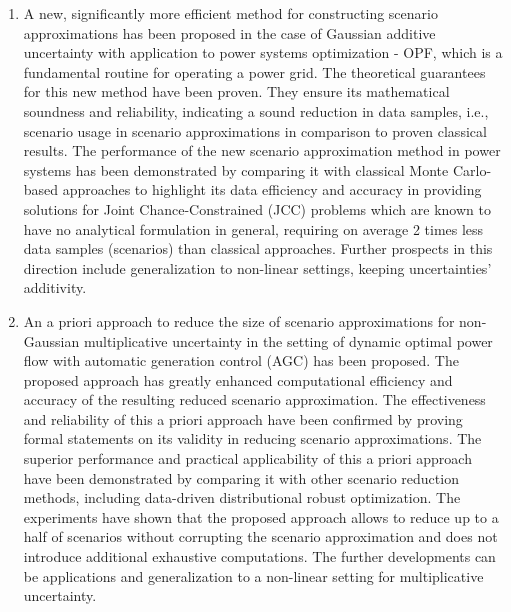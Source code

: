 \begin{enumerate}
    \item A new, significantly more efficient method for constructing scenario approximations has been proposed in the case of Gaussian additive uncertainty with application to power systems optimization - OPF, which is a fundamental routine for operating a power grid. The theoretical guarantees for this new method have been proven. They ensure its mathematical soundness and reliability, indicating a sound reduction in data samples, i.e., scenario usage in scenario approximations in comparison to proven classical results. The performance of the new scenario approximation method in power systems has been demonstrated by comparing it with classical Monte Carlo-based approaches to highlight its data efficiency and accuracy in providing solutions for Joint Chance-Constrained (JCC) problems which are known to have no analytical formulation in general, requiring on average 2 times less data samples (scenarios) than classical approaches. Further prospects in this direction include generalization to non-linear settings, keeping uncertainties' additivity.
    \item An a priori approach to reduce the size of scenario approximations for non-Gaussian multiplicative uncertainty in the setting of dynamic optimal power flow with automatic generation control (AGC) has been proposed. The proposed approach has greatly enhanced computational efficiency and accuracy of the resulting reduced scenario approximation. 
    The effectiveness and reliability of this a priori approach have been confirmed by proving formal statements on its validity in reducing scenario approximations.
    The superior performance and practical applicability of this a priori approach have been demonstrated by comparing it with other scenario reduction methods, including data-driven distributional robust optimization. The experiments have shown that the proposed approach allows to reduce up to a half of scenarios without corrupting the scenario approximation and does not introduce additional exhaustive computations. The further developments can be applications and generalization to a non-linear setting for multiplicative uncertainty.
\end{enumerate}

